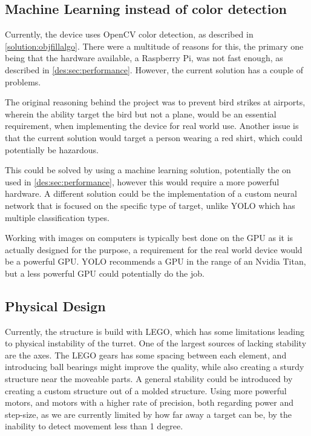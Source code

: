 \subsection{Machine Learning instead of color detection}

Currently, the device uses OpenCV color detection, as described in \autoref{solution:objfillalgo}.
There were a multitude of reasons for this, the primary one being that the hardware available, a Raspberry Pi, was not fast enough, as described in \autoref{des:sec:performance}.
However, the current solution has a couple of problems.

The original reasoning behind the project was to prevent bird strikes at airports, wherein the ability target the bird but not a plane, would be an essential requirement, when implementing the device for real world use.
Another issue is that the current solution would target a person wearing a red shirt, which could potentially be hazardous.

This could be solved by using a machine learning solution, potentially the on used in \autoref{des:sec:performance}, however this would require a more powerful hardware.
A different solution could be the implementation of a custom neural network that is focused on the specific type of target, unlike YOLO which has multiple classification types.

Working with images on computers is typically best done on the GPU as it is actually designed for the purpose, a requirement for the real world device would be a powerful GPU.
YOLO recommends a GPU in the range of an Nvidia Titan, but a less powerful GPU could potentially do the job.

\subsection{Physical Design}
Currently, the structure is build with LEGO, which has some limitations leading to physical instability of the turret.
One of the largest sources of lacking stability are the axes.
The LEGO gears has some spacing between each element, and introducing ball bearings might improve the quality, while also creating a sturdy structure near the moveable parts.
A general stability could be introduced by creating a custom structure out of a molded structure.
Using more powerful motors, and motors with a higher rate of precision, both regarding power and step-size, as we are currently limited by how far away a target can be, by the inability to detect movement less than 1 degree.

